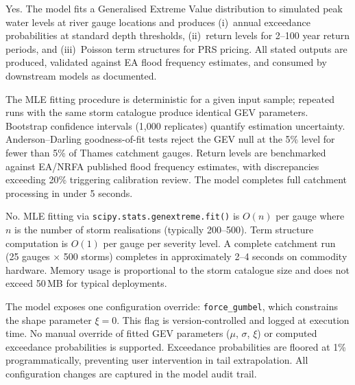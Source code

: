 \documentclass[11pt,a4paper]{article}
\begin{document}
\clearpage

\mkmgovernance

Yes. The model fits a Generalised Extreme Value distribution to simulated peak water levels at river gauge locations and produces (i)~annual exceedance probabilities at standard depth thresholds, (ii)~return levels for 2--100 year return periods, and (iii)~Poisson term structures for PRS pricing. All stated outputs are produced, validated against EA flood frequency estimates, and consumed by downstream models as documented.

The MLE fitting procedure is deterministic for a given input sample; repeated runs with the same storm catalogue produce identical GEV parameters. Bootstrap confidence intervals (1,000 replicates) quantify estimation uncertainty. Anderson--Darling goodness-of-fit tests reject the GEV null at the 5\% level for fewer than 5\% of Thames catchment gauges. Return levels are benchmarked against EA/NRFA published flood frequency estimates, with discrepancies exceeding 20\% triggering calibration review. The model completes full catchment processing in under 5 seconds.

No. MLE fitting via \texttt{scipy.stats.genextreme.fit()} is $O(n)$ per gauge where $n$ is the number of storm realisations (typically 200--500). Term structure computation is $O(1)$ per gauge per severity level. A complete catchment run (25 gauges $\times$ 500 storms) completes in approximately 2--4 seconds on commodity hardware. Memory usage is proportional to the storm catalogue size and does not exceed 50\,MB for typical deployments.

The model exposes one configuration override: \texttt{force\_gumbel}, which constrains the shape parameter $\xi = 0$. This flag is version-controlled and logged at execution time. No manual override of fitted GEV parameters ($\mu$, $\sigma$, $\xi$) or computed exceedance probabilities is supported. Exceedance probabilities are floored at 1\% programmatically, preventing user intervention in tail extrapolation. All configuration changes are captured in the model audit trail.
\end{document}
